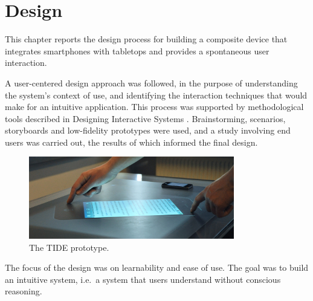 
\chapter{Design}
\label{design}

This chapter reports the design process for building a composite device that integrates smartphones with tabletops and provides a spontaneous user interaction.

A user-centered design approach was followed, in the purpose of understanding the system's context of use, and identifying the interaction techniques that would make for an intuitive application.
This process was supported by methodological tools described in Designing Interactive Systems \citep{Benyon:2010}.
Brainstorming, scenarios, storyboards and low-fidelity prototypes were used, and a study involving end users was carried out, the results of which informed the final design.

\begin{figure}[htb]
  \centering
    \includegraphics[width=0.8\textwidth]{images/tide314}
    \caption{The TIDE prototype.}
    \label{fig:tideHands}
\end{figure}

The focus of the design was on learnability and ease of use.
The goal was to build an intuitive system, i.e.\ a system that users understand without conscious reasoning.

